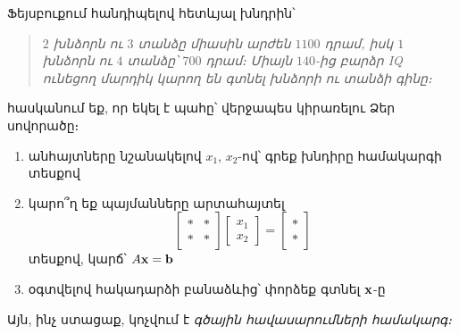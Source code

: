 \begin{problem}
Ֆեյսբուքում հանդիպելով հետևյալ խնդրին՝
\begin{quote}
\textit{$2$ խնձորն ու $3$ տանձը միասին արժեն $1100$ դրամ, իսկ $1$ խնձորն ու $4$ տանձը՝ $700$ դրամ։ Միայն $140$-ից բարձր {\it IQ} ունեցող մարդիկ կարող են գտնել խնձորի ու տանձի գինը։}
\end{quote}
հասկանում եք, որ եկել է պահը՝ վերջապես կիրառելու Ձեր սովորածը։
\begin{enumerate}[label={\alph*}․]
\item անհայտները նշանակելով $x_1$, $x_2$-ով՝ գրեք խնդիրը համակարգի տեսքով

\item կարո՞ղ եք պայմանները արտահայտել
\[
\begin{bmatrix}
    * & * \\ * & *
\end{bmatrix}\begin{bmatrix}
    x_1 \\ x_2
\end{bmatrix}
= \begin{bmatrix}
    * \\ *
\end{bmatrix}
\]
տեսքով, կարճ՝ $A\mathbf{x} = \mathbf{b}$

\item օգտվելով հակադարձի բանաձևից՝ փորձեք գտնել $\mathbf{x}$-ը
\end{enumerate}

Այն, ինչ ստացաք, կոչվում է \textit{գծային հավասարումների համակարգ։}

\end{problem}
